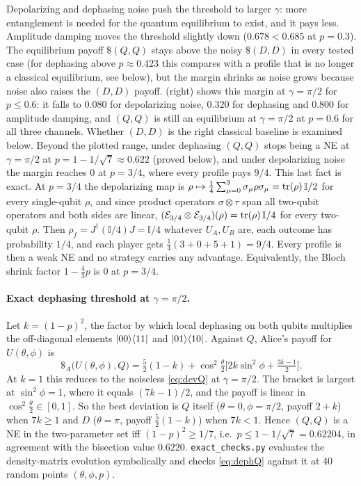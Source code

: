 \documentclass[11pt,a4paper]{article}
\begin{document}
Depolarizing and dephasing noise push the threshold to larger $\gamma$: more entanglement is needed for the quantum equilibrium to exist, and it pays less. Amplitude damping moves the threshold slightly down ($0.678<0.685$ at $p=0.3$). The equilibrium payoff $\$(Q,Q)$ stays above the noisy $\$(D,D)$ in every tested case (for dephasing above $p\approx0.423$ this compares with a profile that is no longer a classical equilibrium, see below), but the margin shrinks as noise grows because noise also raises the $(D,D)$ payoff.  (right) shows this margin at $\gamma=\pi/2$ for $p\le0.6$: it falls to $0.080$ for depolarizing noise, $0.320$ for dephasing and $0.800$ for amplitude damping, and $(Q,Q)$ is still an equilibrium at $\gamma=\pi/2$ at $p=0.6$ for all three channels. Whether $(D,D)$ is the right classical baseline is examined below. Beyond the plotted range, under dephasing $(Q,Q)$ stops being a NE at $\gamma=\pi/2$ at $p=1-1/\sqrt7\approx0.622$ (proved below), and under depolarizing noise the margin reaches $0$ at $p=3/4$, where every profile pays $9/4$. This last fact is exact. At $p=3/4$ the depolarizing map is $\rho\mapsto\frac14\sum_{\mu=0}^{3}\sigma_\mu\rho\sigma_\mu=\tr(\rho)\,\mathbb I/2$ for every single-qubit $\rho$, and since product operators $\sigma\otimes\tau$ span all two-qubit operators and both sides are linear, $(\mathcal E_{3/4}\otimes\mathcal E_{3/4})(\rho)=\tr(\rho)\,\mathbb I/4$ for every two-qubit $\rho$. Then $\rho_f=J^\dagger(\mathbb I/4)J=\mathbb I/4$ whatever $U_A,U_B$ are, each outcome has probability $1/4$, and each player gets $\frac14(3+0+5+1)=9/4$. Every profile is then a weak NE and no strategy carries any advantage. Equivalently, the Bloch shrink factor $1-\frac43p$ is $0$ at $p=3/4$.

\paragraph{Exact dephasing threshold at $\gamma=\pi/2$.} Let $k=(1-p)^2$, the factor by which local dephasing on both qubits multiplies the off-diagonal elements $\ket{00}\!\bra{11}$ and $\ket{01}\!\bra{10}$. Against $Q$, Alice's payoff for $U(\theta,\phi)$ is
\begin{equation}
\$_A\big(U(\theta,\phi),Q\big)=\tfrac52(1-k)+\cos^2\tfrac\theta2\Big[2k\sin^2\phi+\tfrac{3k-1}2\Big].\label{eq:dephQ}
\end{equation}
At $k=1$ this reduces to the noiseless \cref{eq:devQ} at $\gamma=\pi/2$. The bracket is largest at $\sin^2\phi=1$, where it equals $(7k-1)/2$, and the payoff is linear in $\cos^2\frac\theta2\in[0,1]$. So the best deviation is $Q$ itself ($\theta=0,\phi=\pi/2$, payoff $2+k$) when $7k\ge1$ and $D$ ($\theta=\pi$, payoff $\frac52(1-k)$) when $7k<1$. Hence $(Q,Q)$ is a NE in the two-parameter set iff $(1-p)^2\ge1/7$, i.e.\ $p\le1-1/\sqrt7=0.62204$, in agreement with the bisection value $0.6220$. \texttt{exact\_checks.py} evaluates the density-matrix evolution symbolically and checks \cref{eq:dephQ} against it at 40 random points $(\theta,\phi,p)$.
\end{document}
